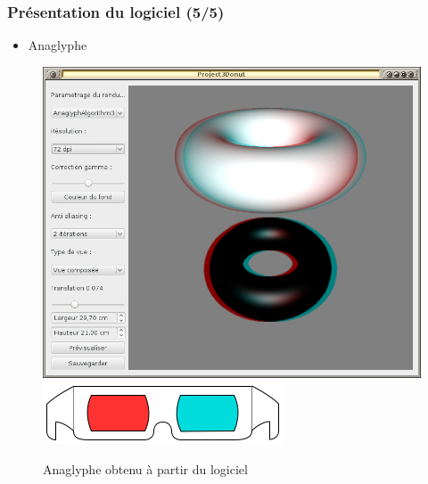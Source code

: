 \documentclass{beamer}
\begin{document}
%
\begin{frame}
\frametitle{Présentation du logiciel (5/5)}
\begin{itemize}[label=$\bullet$]
\item Anaglyphe
\end{itemize}
\begin{figure}
\centering
\includegraphics[scale=0.28]{renduanaglyphe.png}
\includegraphics[scale=0.2]{lunettes.png}
\caption{Anaglyphe obtenu à partir du logiciel}
\end{figure}
\end{frame}


\end{document}

